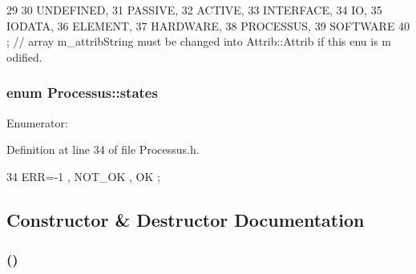 \begin{DoxyCode}
29                 {
30     UNDEFINED,
31     PASSIVE,
32     ACTIVE,
33     INTERFACE,
34     IO,
35     IODATA,
36     ELEMENT,
37     HARDWARE,
38     PROCESSUS,
39     SOFTWARE 
40   }; // array m_attribString must be changed into Attrib::Attrib if this enu is m
      odified. 
\end{DoxyCode}
\hypertarget{classProcessus_a36278773bd98f2d5612fea40c7774821}{
\subsubsection[{states}]{\setlength{\rightskip}{0pt plus 5cm}enum {\bf Processus::states}}}
\label{classProcessus_a36278773bd98f2d5612fea40c7774821}
\begin{Desc}
\item[Enumerator: ]\par
\begin{description}
\item[{\em 
\hypertarget{classProcessus_a36278773bd98f2d5612fea40c7774821adaf73ad5d0a09f952d0f18dbbe1c7493}{
ERR}
\label{classProcessus_a36278773bd98f2d5612fea40c7774821adaf73ad5d0a09f952d0f18dbbe1c7493}
}]\item[{\em 
\hypertarget{classProcessus_a36278773bd98f2d5612fea40c7774821a629082f49d6e8df6b6da2b8fbb9d80fb}{
NOT\_\-OK}
\label{classProcessus_a36278773bd98f2d5612fea40c7774821a629082f49d6e8df6b6da2b8fbb9d80fb}
}]\item[{\em 
\hypertarget{classProcessus_a36278773bd98f2d5612fea40c7774821af77c64124fa175f28200166fff165ea2}{
OK}
\label{classProcessus_a36278773bd98f2d5612fea40c7774821af77c64124fa175f28200166fff165ea2}
}]\end{description}
\end{Desc}



Definition at line 34 of file Processus.h.


\begin{DoxyCode}
34 { ERR=-1 , NOT_OK , OK };
\end{DoxyCode}


\subsection{Constructor \& Destructor Documentation}
\hypertarget{classTestSPI_a0a4bc6b63f406b3c2830c14873b1ce54}{
\subsubsection[{TestSPI}]{ ()}}
\label{classTestSPI_a0a4bc6b63f406b3c2830c14873b1ce54}


